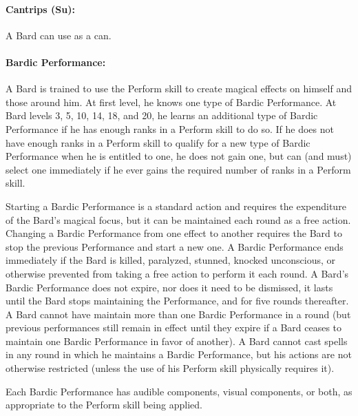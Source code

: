 \paragraph[Cantrips]{Cantrips (Su):} 
A Bard can use  as a  can.

\paragraph{Bardic Performance:}
A Bard is trained to use the Perform skill to create magical effects on himself and those around him. At first level, he knows one type of Bardic Performance. At Bard levels 3, 5, 10, 14, 18, and 20, he learns an additional type of Bardic Performance if he has enough ranks in a Perform skill to do so. If he does not have enough ranks in a Perform skill to qualify for a new type of Bardic Performance when he is entitled to one, he does not gain one, but can (and must) select one immediately if he ever gains the required number of ranks in a Perform skill.


Starting a Bardic Performance is a standard action and requires the expenditure of the Bard's magical focus, but it can be maintained each round as a free action. 
Changing a Bardic Performance from one effect to another requires the Bard to stop the previous Performance and start a new one. 
A Bardic Performance ends immediately if the Bard is killed, paralyzed, stunned, knocked unconscious, or otherwise prevented from taking a free action to perform it each round. 
A Bard's Bardic Performance does not expire, nor does it need to be dismissed, it lasts until the Bard stops maintaining the Performance, and for five rounds thereafter. 
A Bard cannot have maintain more than one Bardic Performance in a round (but previous performances still remain in effect until they expire if a Bard ceases to maintain one Bardic Performance in favor of another). 
A Bard cannot cast spells in any round in which he maintains a Bardic Performance, but his actions are not otherwise restricted (unless the use of his Perform skill physically requires it).

Each Bardic Performance has audible components, visual components, or both, as appropriate to the Perform skill being applied.

